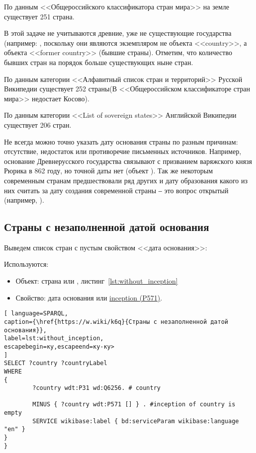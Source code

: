 По данным <<Общероссийского классификатора стран мира>> на земле существует 251 страна.

В этой задаче не учитываются древние, уже не существующие государства (например: , поскольку они являются экземпляром не объекта <<country>>, а объекта <<former country>> (бывшие страны). Отметим, что количество бывших стран на порядок больше существующих ныне стран.

По данным категории <<Алфавитный список стран и территорий>> Русской Википедии существует 252 страны(В <<Общероссийском классификаторе стран мира>> недостает Косово).

По данным категории <<List of sovereign states>> Английской Википедии существует 206 стран.

Не всегда можно точно указать дату основания страны по разным причинам: отсутствие, недостаток или противоречие письменных источников. Например, основание Древнерусского государства связывают с призванием варяжского князя Рюрика в 862 году, но точной даты нет (объект ). Так же некоторым современным странам предшествовали ряд других и дату образования какого из них считать за дату создания современной страны ‒ это вопрос открытый (например, ).

\subsection{Страны с незаполненной датой основания}

Выведем список стран с пустым свойством <<дата основания>>:

Используются:

\begin{itemize}
	\item Объект: страна или , листинг~\ref{lst:without_inception}
	\item Свойство: дата основания или \href{https://www.wikidata.org/wiki/Property:P571}{inception (P571)}.
\end{itemize}

\begin{lstlisting}[ language=SPARQL, 
caption={\href{https://w.wiki/k6q}{Страны с незаполненной датой основания}},
label=lst:without_inception, 
escapebegin=ку,escapeend=ку-ку>
]
SELECT ?country ?countryLabel 
WHERE
{
		?country wdt:P31 wd:Q6256. # country
		
		MINUS { ?country wdt:P571 [] } . #inception of country is empty
		SERVICE wikibase:label { bd:serviceParam wikibase:language "en" }
}
}
\end{lstlisting}

